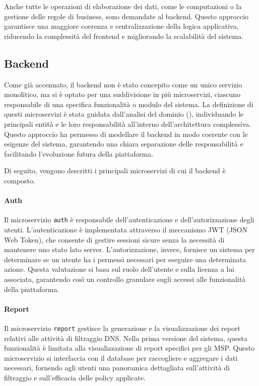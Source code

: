 Anche tutte le operazioni di elaborazione dei dati, come le computazioni o la gestione delle regole di business, sono demandate al backend. Questo approccio garantisce una maggiore coerenza e centralizzazione della logica applicativa, riducendo la complessità del frontend e migliorando la scalabilità del sistema.

\subsection{Backend}
Come già accennato, il backend non è stato concepito come un unico servizio monolitico, ma si è optato per una suddivisione in più microservizi, ciascuno responsabile di una specifica funzionalità o modulo del sistema. La definizione di questi microservizi è stata guidata dall'analisi del dominio (), individuando le principali entità e le loro responsabilità all'interno dell'architettura complessiva. Questo approccio ha permesso di modellare il backend in modo coerente con le esigenze del sistema, garantendo una chiara separazione delle responsabilità e facilitando l'evoluzione futura della piattaforma.

Di seguito, vengono descritti i principali microservizi di cui il backend è composto.

\paragraph{Auth}
Il microservizio \texttt{auth} è responsabile dell'autenticazione e dell'autorizzazione degli utenti. L'autenticazione è implementata attraverso il meccanismo JWT (JSON Web Token), che consente di gestire sessioni sicure senza la necessità di mantenere uno stato lato server.
L'autorizzazione, invece, fornisce un sistema per determinare se un utente ha i permessi necessari per eseguire una determinata azione. Questa valutazione si basa sul ruolo dell'utente e sulla licenza a lui associata, garantendo così un controllo granulare sugli accessi alle funzionalità della piattaforma.

\paragraph{Report}
Il microservizio \texttt{report} gestisce la generazione e la visualizzazione dei report relativi alle attività di filtraggio DNS. Nella prima versione del sistema, questa funzionalità è limitata alla visualizzazione di report specifici per gli MSP. Questo microservizio si interfaccia con il database per raccogliere e aggregare i dati necessari, fornendo agli utenti una panoramica dettagliata sull'attività di filtraggio e sull'efficacia delle policy applicate.

